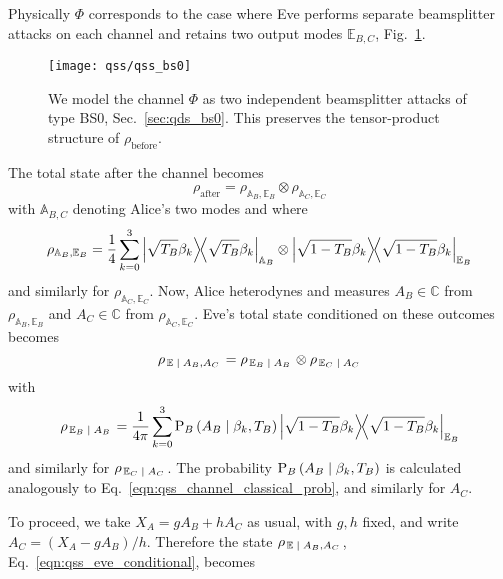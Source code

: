 Physically $\Phi$ corresponds to the case where Eve performs separate beamsplitter attacks on each channel and retains two output modes $\mathbb{E}_{B, C}$, Fig.~\ref{fig:qss_bs0_attack}.

\begin{figure}[htp]
\centering
\texttt{[image: qss/qss\_bs0]}
\caption{\label{fig:qss_bs0_attack} We model the channel $\Phi$ as two independent beamsplitter attacks of type BS$0$, Sec.~\ref{sec:qds_bs0}. This preserves the tensor-product structure of $\rho_{\text{before}}$.}
\end{figure}


The total state after the channel becomes
\begin{equation}
\rho_{\text{after}} = \rho_{\mathbb{A}_B, \mathbb{E}_B} \otimes \rho_{\mathbb{A}_C, \mathbb{E}_C}
\end{equation}
with $\mathbb{A}_{B, C}$ denoting Alice's two modes and where
\begin{equation}
\rho_{\mathbb{A}_B, \mathbb{E}_B} = \frac{1}{4} \sum_{k=0}^3 \dyad{\sqrt{T_B} \beta_k}_{\mathbb{A}_B} \otimes \dyad{\sqrt{1-T_B} \beta_k}_{\mathbb{E}_B}
\end{equation}
and similarly for $\rho_{\mathbb{A}_C, \mathbb{E}_C}$. Now, Alice heterodynes and measures $A_B \in \mathbb{C}$ from $\rho_{\mathbb{A}_B, \mathbb{E}_B}$ and $A_C \in \mathbb{C}$ from $\rho_{\mathbb{A}_C, \mathbb{E}_C}$. Eve's total state conditioned on these outcomes becomes 
\begin{equation}\label{eqn:qss_eve_conditional}
\rho_{\left.\mathbb{E} \; \middle| \; A_B, A_C\right.} = \rho_{\left.\mathbb{E}_B \; \middle| \; A_B\right.} \otimes \rho_{\left. \mathbb{E}_C \; \middle| \; A_C\right.}
\end{equation}
with
\begin{equation}
\rho_{\left.\mathbb{E}_B \given A_B\right.} = \frac{1}{4 \pi} \sum_{k=0}^3 \text{P}_B\left(A_B \given \beta_k, T_B\right) \dyad{\sqrt{1-T_B} \beta_k}_{\mathbb{E}_B}
\end{equation}
and similarly for $\rho_{\left.\mathbb{E}_C \; \middle| \; A_C\right.}$. The probability $\text{P}_B\left(A_B \; \middle| \; \beta_k, T_B\right)$ is calculated analogously to Eq.~\ref{eqn:qss_channel_classical_prob}, and similarly for $A_C$.

To proceed, we take $X_A = g A_B + h A_C$ as usual, with $g, h$ fixed, and write $A_C = \left(X_A - g A_B\right)/h$. Therefore the state $\rho_{\left.\mathbb{E} \; \middle| \; A_B, A_C\right.}$, Eq.~\ref{eqn:qss_eve_conditional}, becomes

